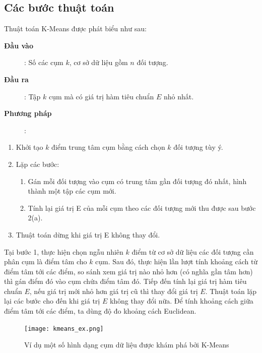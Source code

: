 \documentclass{article}
\begin{document}
    \subsection{Các bước thuật toán}
    Thuật toán K-Means được phát biểu như sau:
    \begin{description}
        \item[\textbf{Đầu vào}]: Số các cụm $k$, cơ sở dữ liệu gồm $n$ đối tượng.
        \item[\textbf{Đầu ra}]: Tập $k$ cụm mà có giá trị hàm tiêu chuẩn $E$ nhỏ nhất.
        \item[\textbf{Phương pháp}]: 
    \end{description}
    \begin{itemize}        
        \begin{enumerate}
            \item Khởi tạo $k$ điểm trung tâm cụm bằng cách chọn $k$ đối tượng tùy ý.
            \item Lặp các bước:
            \begin{enumerate}
                \item Gán mỗi đối tượng vào cụm có trung tâm gần đối tượng đó nhất, hình thành một tập các cụm mới.
                \item Tính lại giá trị E của mỗi cụm theo các đối tượng mới thu được sau bước 2(a).
            \end{enumerate}
            \item Thuật toán dừng khi giá trị E không thay đổi.
        \end{enumerate}
    \end{itemize}

    Tại bước 1, thực hiện chọn ngẫu nhiên $k$ điểm từ cơ sở dữ liệu các đối tượng cần phân cụm là điểm tâm cho $k$ cụm. Sau đó, thực hiện lần lượt tính khoảng cách từ điểm tâm tới các điểm, so sánh xem giá trị nào nhỏ hơn (có nghĩa gần tâm hơn) thì gán điểm đó vào cụm chứa điểm tâm đó. Tiếp đến tính lại giá trị hàm tiêu chuẩn $E$, nếu giá trị mới nhỏ hơn giá trị cũ thì thay đổi giá trị $E$. Thuật toán lặp lại các bước cho đến khi giá trị $E$ không thay đổi nữa. Để tính khoảng cách giữa điểm tâm tới các điểm, ta dùng độ đo khoảng cách Euclidean.

    \begin{figure}[H]
        \centering            \texttt{[image: kmeans\_ex.png]} \\
        \caption{Ví dụ một số hình dạng cụm dữ liệu được khám phá bởi K-Means}
        \label{fig:kmeans_ex}
    \end{figure}
\end{document}
